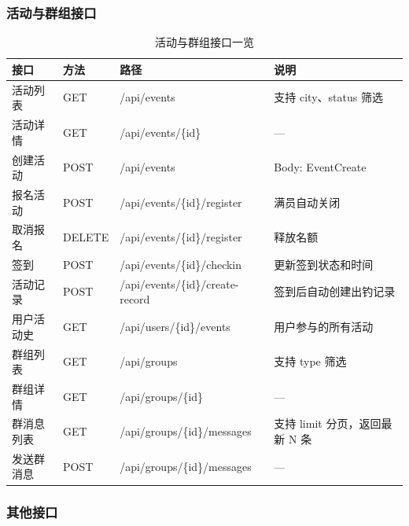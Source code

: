 \documentclass[12pt,a4paper]{ctexart}
\begin{document}
\subsubsection{活动与群组接口}

\begin{table}[H]
  \centering
  \caption{活动与群组接口一览}
  \label{tab:api-events}
  \begin{tabular}{p{3cm}p{2cm}p{3.5cm}p{3.5cm}}
    \toprule
    \textbf{接口} & \textbf{方法} & \textbf{路径} & \textbf{说明} \\
    \midrule
    活动列表 & GET & /api/events & 支持 city、status 筛选 \\
    活动详情 & GET & /api/events/\{id\} & — \\
    创建活动 & POST & /api/events & Body: EventCreate \\
    报名活动 & POST & /api/events/\{id\}/register & 满员自动关闭 \\
    取消报名 & DELETE & /api/events/\{id\}/register & 释放名额 \\
    签到 & POST & /api/events/\{id\}/checkin & 更新签到状态和时间 \\
    活动记录 & POST & /api/events/\{id\}/create-record & 签到后自动创建出钓记录 \\
    用户活动史 & GET & /api/users/\{id\}/events & 用户参与的所有活动 \\
    群组列表 & GET & /api/groups & 支持 type 筛选 \\
    群组详情 & GET & /api/groups/\{id\} & — \\
    群消息列表 & GET & /api/groups/\{id\}/messages & 支持 limit 分页，返回最新 N 条 \\
    发送群消息 & POST & /api/groups/\{id\}/messages & — \\
    \bottomrule
  \end{tabular}
\end{table}

\subsubsection{其他接口}
\end{document}
